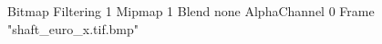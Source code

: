 {Bitmap
	{Filtering 1}
	{Mipmap 1}
	{Blend none}
	{AlphaChannel 0}
	{Frame "shaft_euro_x.tif.bmp"}
}
